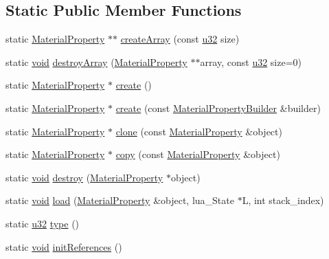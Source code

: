 \subsection*{Static Public Member Functions}
\begin{DoxyCompactItemize}
\item 
static \mbox{\hyperlink{classnjli_1_1_material_property}{Material\+Property}} $\ast$$\ast$ \mbox{\hyperlink{classnjli_1_1_material_property_ab1577f6ebd7e36432b326dbe37602185}{create\+Array}} (const \mbox{\hyperlink{_util_8h_a10e94b422ef0c20dcdec20d31a1f5049}{u32}} size)
\item 
static \mbox{\hyperlink{_thread_8h_af1e856da2e658414cb2456cb6f7ebc66}{void}} \mbox{\hyperlink{classnjli_1_1_material_property_a663827a5878ba71adb46ace8142f823d}{destroy\+Array}} (\mbox{\hyperlink{classnjli_1_1_material_property}{Material\+Property}} $\ast$$\ast$array, const \mbox{\hyperlink{_util_8h_a10e94b422ef0c20dcdec20d31a1f5049}{u32}} size=0)
\item 
static \mbox{\hyperlink{classnjli_1_1_material_property}{Material\+Property}} $\ast$ \mbox{\hyperlink{classnjli_1_1_material_property_ab7a5e5535ed79f6ac2c86c8b78214007}{create}} ()
\item 
static \mbox{\hyperlink{classnjli_1_1_material_property}{Material\+Property}} $\ast$ \mbox{\hyperlink{classnjli_1_1_material_property_a030ee6b5b94ec745e83b044ccc6906ff}{create}} (const \mbox{\hyperlink{classnjli_1_1_material_property_builder}{Material\+Property\+Builder}} \&builder)
\item 
static \mbox{\hyperlink{classnjli_1_1_material_property}{Material\+Property}} $\ast$ \mbox{\hyperlink{classnjli_1_1_material_property_a7cbf31bfe41a2048c0bd26d99f57a74c}{clone}} (const \mbox{\hyperlink{classnjli_1_1_material_property}{Material\+Property}} \&object)
\item 
static \mbox{\hyperlink{classnjli_1_1_material_property}{Material\+Property}} $\ast$ \mbox{\hyperlink{classnjli_1_1_material_property_a8347b1bfe6959984904ef14d113bad53}{copy}} (const \mbox{\hyperlink{classnjli_1_1_material_property}{Material\+Property}} \&object)
\item 
static \mbox{\hyperlink{_thread_8h_af1e856da2e658414cb2456cb6f7ebc66}{void}} \mbox{\hyperlink{classnjli_1_1_material_property_ae3efb73be6d8d3e1bcca27d438959fe0}{destroy}} (\mbox{\hyperlink{classnjli_1_1_material_property}{Material\+Property}} $\ast$object)
\item 
static \mbox{\hyperlink{_thread_8h_af1e856da2e658414cb2456cb6f7ebc66}{void}} \mbox{\hyperlink{classnjli_1_1_material_property_a4a3dce836762ad8e911e7965df320b07}{load}} (\mbox{\hyperlink{classnjli_1_1_material_property}{Material\+Property}} \&object, lua\+\_\+\+State $\ast$L, int stack\+\_\+index)
\item 
static \mbox{\hyperlink{_util_8h_a10e94b422ef0c20dcdec20d31a1f5049}{u32}} \mbox{\hyperlink{classnjli_1_1_material_property_a4d223566b0ede80d533b50bdbe9e6717}{type}} ()
\item 
static \mbox{\hyperlink{_thread_8h_af1e856da2e658414cb2456cb6f7ebc66}{void}} \mbox{\hyperlink{classnjli_1_1_material_property_a136a817ad5462dc2946014aab739bddd}{init\+References}} ()
\end{DoxyCompactItemize}
